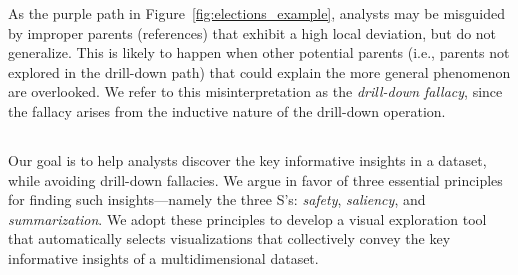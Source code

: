 \par As  the purple path 
in Figure~\ref{fig:elections_example}, 
 analysts may be misguided by improper parents (references) that exhibit a high local deviation, but do not generalize. This is likely to happen when other potential parents (i.e., parents not explored in the drill-down path) that could explain the more general phenomenon are overlooked. We refer to this misinterpretation as the \emph{drill-down fallacy}, since the fallacy arises from the inductive nature of the drill-down operation. 
\subsection{}
Our goal is to help analysts discover the key informative insights in a dataset, while avoiding drill-down fallacies. We argue in favor of three essential principles for finding such insights---namely the three S's: \emph{safety}, \emph{saliency}, and \emph{summarization}. We adopt these principles to develop a visual exploration tool that automatically selects visualizations that collectively convey the key informative insights of a multidimensional dataset.
